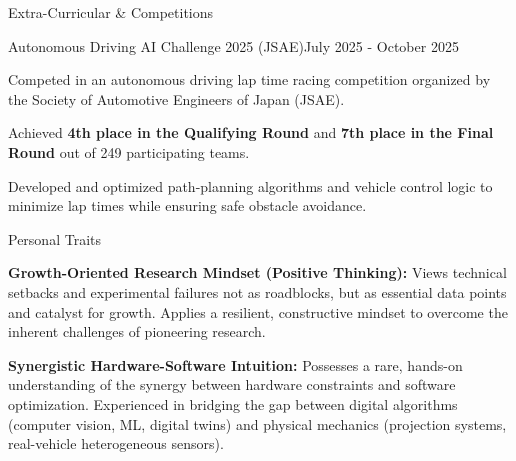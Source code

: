 \documentclass{resume} %
\begin{document}
\newpage
\begin{rSection}{Extra-Curricular \& Competitions}

  \begin{rSubsection}{Autonomous Driving AI Challenge 2025 (JSAE)}{July 2025 - October 2025}{}{}
    \item Competed in an autonomous driving lap time racing competition organized by the Society of Automotive Engineers of Japan (JSAE).
    \item Achieved \textbf{4th place in the Qualifying Round} and \textbf{7th place in the Final Round} out of 249 participating teams.
    \item Developed and optimized path-planning algorithms and vehicle control logic to minimize lap times while ensuring safe obstacle avoidance.
  \end{rSubsection}

\end{rSection}

\begin{rSection}{Personal Traits}

  \item \textbf{Growth-Oriented Research Mindset (Positive Thinking):} Views technical setbacks and experimental failures not as roadblocks, but as essential data points and catalyst for growth. Applies a resilient, constructive mindset to overcome the inherent challenges of pioneering research.

  \item \textbf{Synergistic Hardware-Software Intuition:} Possesses a rare, hands-on understanding of the synergy between hardware constraints and software optimization. Experienced in bridging the gap between digital algorithms (computer vision, ML, digital twins) and physical mechanics (projection systems, real-vehicle heterogeneous sensors).

\end{rSection}
\end{document}
